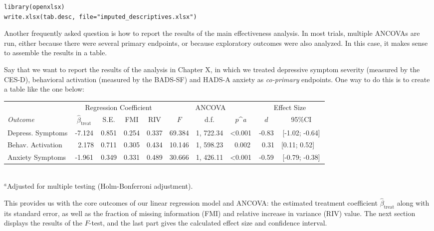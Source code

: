 \begin{lstlisting}
library(openxlsx)
write.xlsx(tab.desc, file="imputed_descriptives.xlsx")
\end{lstlisting}

Another frequently asked question is how to report the results of the main effectiveness analysis. In most trials, multiple ANCOVAs are run, either because there were several primary endpoints, or because exploratory outcomes were also analyzed. In this case, it makes sense to assemble the results in a table. 

Say that we want to report the results of the analysis in Chapter X, in which we treated depressive symptom severity (measured by the CES-D), behavioral activation (measured by the BADS-SF) and HADS-A anxiety as \emph{co-primary} endpoints. One way to do this is to create a table like the one below:

\begin{table}[htpb]
\centering
\scriptsize
\begin{tabular}{lccccccccc}\toprule
& \multicolumn{4}{c}{Regression Coefficient} & \multicolumn{3}{c}{ANCOVA} & \multicolumn{2}{c}{Effect Size}
\\\cmidrule(lr){2-5}\cmidrule(lr){6-8}\cmidrule(lr){9-10}
\emph{Outcome}  & $\hat\beta_{\text{treat}}$  & S.E. & FMI & RIV   & $F$  & d.f. & $p$^{\textit{a}} & $d$ & 95\%CI  \\\midrule
Depress. Symptoms    & -7.124 & 0.851 & 0.254 & 0.337 & 69.384 & 1, 722.34 & <0.001   & -0.83 & [-1.02; -0.64]  \\
Behav. Activation    & ~2.178 & 0.711 & 0.305 & 0.434 & 10.146 & 1, 598.23 & ~0.002   & ~0.31 & [0.11; 0.52]~~  \\
Anxiety Symptoms     & -1.961 & 0.349 & 0.331 & 0.489 & 30.666 & 1, 426.11 & <0.001   & -0.59 & [-0.79; -0.38] \\\bottomrule
\end{tabular} \\ 
$^{\textit{a}}$Adjusted for multiple testing (Holm-Bonferroni adjustment). ~ ~ ~ ~ ~ ~ ~ ~ ~ ~ ~ ~ ~ ~ ~ ~ ~ ~ ~ ~ ~ ~ ~ ~ ~ ~ ~ ~ ~ ~ ~ ~ ~ ~ ~ ~ ~ ~ ~ ~
\end{table}

This provides us with the core outcomes of our linear regression model and ANCOVA: the estimated treatment coefficient $\hat\beta_{\text{treat}}$ along with its standard error, as well as the fraction of missing information (FMI) and relative increase in variance (RIV) value. The next section displays the results of the $F$-test, and the last part gives the calculated effect size and confidence interval.

